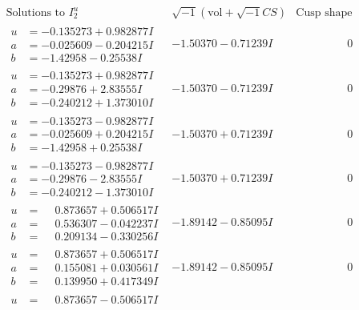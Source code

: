\documentclass[1p]{elsarticle_modified}
\theoremstyle{definition}
\newcommand{\I}{\sqrt{-1}}
\begin{document}
$$\begin{array}{c|c|c}  
\text{Solutions to }I^u_{2}& \I (\text{vol} + \sqrt{-1}CS) & \text{Cusp shape}\\
 \hline 
\begin{aligned}
u &= -0.135273 + 0.982877 I \\
a &= -0.025609 - 0.204215 I \\
b &= -1.42958 - 0.25538 I\end{aligned}
 & -1.50370 - 0.71239 I & \phantom{-0.000000 } 0 \\ \hline\begin{aligned}
u &= -0.135273 + 0.982877 I \\
a &= -0.29876 + 2.83555 I \\
b &= -0.240212 + 1.373010 I\end{aligned}
 & -1.50370 - 0.71239 I & \phantom{-0.000000 } 0 \\ \hline\begin{aligned}
u &= -0.135273 - 0.982877 I \\
a &= -0.025609 + 0.204215 I \\
b &= -1.42958 + 0.25538 I\end{aligned}
 & -1.50370 + 0.71239 I & \phantom{-0.000000 } 0 \\ \hline\begin{aligned}
u &= -0.135273 - 0.982877 I \\
a &= -0.29876 - 2.83555 I \\
b &= -0.240212 - 1.373010 I\end{aligned}
 & -1.50370 + 0.71239 I & \phantom{-0.000000 } 0 \\ \hline\begin{aligned}
u &= \phantom{-}0.873657 + 0.506517 I \\
a &= \phantom{-}0.536307 - 0.042237 I \\
b &= \phantom{-}0.209134 - 0.330256 I\end{aligned}
 & -1.89142 - 0.85095 I & \phantom{-0.000000 } 0 \\ \hline\begin{aligned}
u &= \phantom{-}0.873657 + 0.506517 I \\
a &= \phantom{-}0.155081 + 0.030561 I \\
b &= \phantom{-}0.139950 + 0.417349 I\end{aligned}
 & -1.89142 - 0.85095 I & \phantom{-0.000000 } 0 \\ \hline\begin{aligned}
u &= \phantom{-}0.873657 - 0.506517 I \\

\end{aligned}
\end{array}$$
\end{document}

